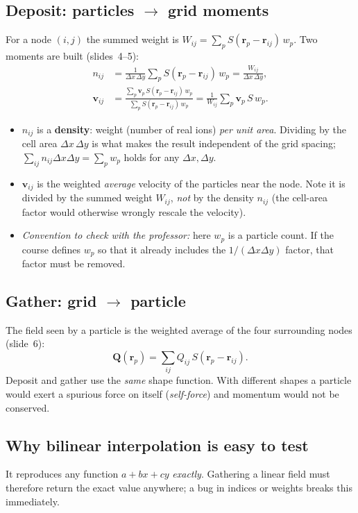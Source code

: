 \documentclass[11pt,a4paper]{article}
\newcommand{\vv}{\mathbf{v}}
\begin{document}
\subsection{Deposit: particles $\to$ grid moments}
For a node $(i,j)$ the summed weight is $W_{ij}=\sum_p S(\mathbf r_p-\mathbf r_{ij})\,w_p$. Two
moments are built (slides~4--5):
\begin{align}
  n_{ij}&=\frac{1}{\Delta x\,\Delta y}\sum_p S(\mathbf r_p-\mathbf r_{ij})\,w_p
        =\frac{W_{ij}}{\Delta x\,\Delta y},\\
  \vv_{ij}&=\frac{\sum_p \vv_p\,S(\mathbf r_p-\mathbf r_{ij})\,w_p}{\sum_p S(\mathbf r_p-\mathbf r_{ij})\,w_p}
        =\frac{1}{W_{ij}}\sum_p\vv_p\,S\,w_p .
\end{align}
\begin{itemize}
  \item $n_{ij}$ is a \textbf{density}: weight (number of real ions) \emph{per unit area}. Dividing by the
        cell area $\Delta x\,\Delta y$ is what makes the result independent of the grid spacing;
        $\sum_{ij}n_{ij}\Delta x\Delta y=\sum_pw_p$ holds for any $\Delta x,\Delta y$.
  \item $\vv_{ij}$ is the weighted \emph{average} velocity of the particles near the node. Note it is
        divided by the summed weight $W_{ij}$, \emph{not} by the density $n_{ij}$ (the cell-area
        factor would otherwise wrongly rescale the velocity).
  \item \emph{Convention to check with the professor:} here $w_p$ is a particle count. If the
        course defines $w_p$ so that it already includes the $1/(\Delta x\Delta y)$ factor, that factor
        must be removed.
\end{itemize}

\subsection{Gather: grid $\to$ particle}
The field seen by a particle is the weighted average of the four surrounding nodes (slide~6):
\begin{equation}
  \mathbf Q(\mathbf r_p)=\sum_{ij}Q_{ij}\,S(\mathbf r_p-\mathbf r_{ij}).
\end{equation}
Deposit and gather use the \emph{same} shape function. With different shapes a particle would exert a
spurious force on itself (\emph{self-force}) and momentum would not be conserved.

\subsection{Why bilinear interpolation is easy to test}
It reproduces any function $a+bx+cy$ \emph{exactly}. Gathering a linear field must therefore return the
exact value anywhere; a bug in indices or weights breaks this immediately.
\end{document}
